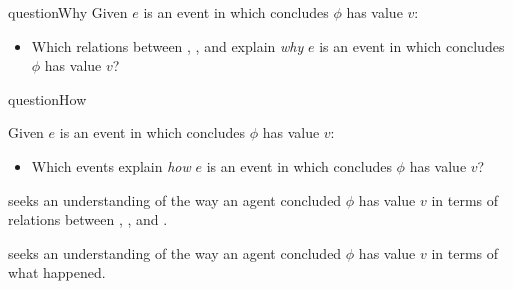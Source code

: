 \begin{note}
\begin{question}{questionWhy}{\qWhy{}}
    Given \(e\) is an event in which \vAgent{} concludes \(\phi\) has value \(v\):
    \begin{itemize}
    \item
      Which relations between , , and  explain \emph{why} \(e\) is an event in which \vAgent{} concludes \(\phi\) has value \(v\)?
    \end{itemize}
    \vspace{-\baselineskip}
  \end{question}

  \begin{question}{questionHow}{\qHow{}}
    \label{q:how}
    \medskip

    Given \(e\) is an event in which \vAgent{} concludes \(\phi\) has value \(v\):
    \begin{itemize}
    \item
      Which events explain \emph{how} \(e\) is an event in which \vAgent{} concludes \(\phi\) has value \(v\)?
    \end{itemize}
    \vspace{-\baselineskip}
  \end{question}
\end{note}

\begin{note}
  \qWhy{} seeks an understanding of the way an agent concluded \(\phi\) has value \(v\) in terms of relations between , , and .

  \qHow{} seeks an understanding of the way an agent concluded \(\phi\) has value \(v\) in terms of what happened.
\end{note}


